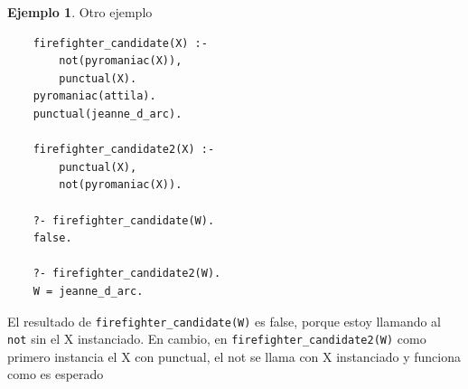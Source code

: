 \documentclass{report}
\theoremstyle{definition} %
\newtheorem*{example*}{Ejemplo}
\begin{document}
\begin{example*} Otro ejemplo
    \begin{verbatim}
    firefighter_candidate(X) :-
        not(pyromaniac(X)),
        punctual(X).
    pyromaniac(attila).
    punctual(jeanne_d_arc).

    firefighter_candidate2(X) :-
        punctual(X),
        not(pyromaniac(X)).
    
    ?- firefighter_candidate(W).
    false.
    
    ?- firefighter_candidate2(W).
    W = jeanne_d_arc.
    \end{verbatim}

    El resultado de \texttt{firefighter\_candidate(W)} es false, porque estoy
    llamando al \texttt{not} sin el X instanciado. En cambio, en
    \texttt{firefighter\_candidate2(W)} como primero instancia el X con punctual,
    el not se llama con X instanciado y funciona como es esperado
\end{example*}
\end{document}
